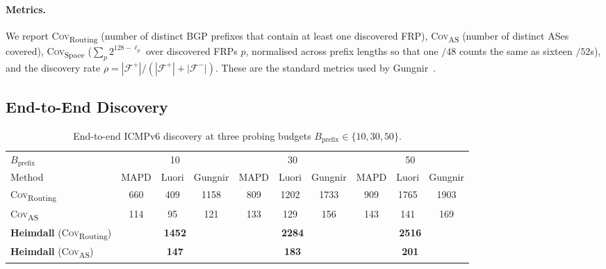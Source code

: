 \documentclass[conference]{IEEEtran}
\begin{document}
\paragraph{Metrics.}  We report
\textsc{Cov}\textsubscript{Routing} (number of distinct BGP prefixes
that contain at least one discovered FRP),
\textsc{Cov}\textsubscript{AS} (number of distinct ASes covered),
\textsc{Cov}\textsubscript{Space} ($\sum_p 2^{128-\ell_p}$ over
discovered FRPs $p$, normalised across prefix lengths so that one $/48$
counts the same as sixteen $/52$s), and the discovery rate
$\rho = |\mathcal F^{+}|/(|\mathcal F^{+}|+|\mathcal F^{-}|)$.  These
are the standard metrics used by Gungnir~\cite{gungnir2025}.

\subsection{End-to-End Discovery}\label{sec:eval-e2e}

\begin{table}[t]
\centering
\caption{End-to-end ICMPv6 discovery at three probing budgets
$B_{\mathrm{prefix}}\in\{10,30,50\}$.}
\label{tab:icmp}
\setlength{\tabcolsep}{4pt}
\footnotesize
\begin{tabular}{l|ccc|ccc|ccc}
\toprule
$B_{\mathrm{prefix}}$ & \multicolumn{3}{c|}{10}
                     & \multicolumn{3}{c|}{30}
                     & \multicolumn{3}{c}{50}\\
Method & MAPD & Luori & Gungnir
       & MAPD & Luori & Gungnir
       & MAPD & Luori & Gungnir\\
\midrule
\textsc{Cov}\textsubscript{Routing} & 660  & 409  & 1158
                                    & 809  & 1202 & 1733
                                    & 909  & 1765 & 1903\\
\textsc{Cov}\textsubscript{AS}      & 114  & 95   & 121
                                    & 133  & 129  & 156
                                    & 143  & 141  & 169\\
\midrule
\textbf{Heimdall} (\textsc{Cov}\textsubscript{Routing})
            & \multicolumn{3}{c|}{\textbf{1452}}
            & \multicolumn{3}{c|}{\textbf{2284}}
            & \multicolumn{3}{c}{\textbf{2516}}\\
\textbf{Heimdall} (\textsc{Cov}\textsubscript{AS})
            & \multicolumn{3}{c|}{\textbf{147}}
            & \multicolumn{3}{c|}{\textbf{183}}
            & \multicolumn{3}{c}{\textbf{201}}\\
\bottomrule
\end{tabular}
\end{table}
\end{document}
